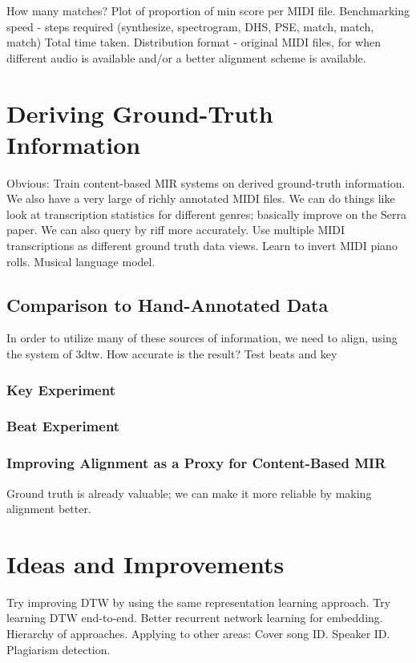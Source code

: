 How many matches?  Plot of proportion of min score per MIDI file.
Benchmarking speed - steps required (synthesize, spectrogram, DHS, PSE, match, match, match)  Total time taken.
Distribution format - original MIDI files, for when different audio is available and/or a better alignment scheme is available.

\section{Deriving Ground-Truth Information}
\label{sec:deriving}

Obvious: Train content-based MIR systems on derived ground-truth information.
We also have a very large of richly annotated MIDI files.
We can do things like look at transcription statistics for different genres; basically improve on the Serra paper.
We can also query by riff more accurately.
Use multiple MIDI transcriptions as different ground truth data views.
Learn to invert MIDI piano rolls.
Musical language model.

\subsection{Comparison to Hand-Annotated Data}
\label{sec:reliability}

In order to utilize many of these sources of information, we need to align, using the system of 3dtw.
How accurate is the result?
Test beats and key

\subsubsection{Key Experiment}

\subsubsection{Beat Experiment}

\subsubsection{Improving Alignment as a Proxy for Content-Based MIR}

Ground truth is already valuable; we can make it more reliable by making alignment better.

\section{Ideas and Improvements}
\label{sec:ideas}

Try improving DTW by using the same representation learning approach.
Try learning DTW end-to-end.
Better recurrent network learning for embedding.
Hierarchy of approaches.
Applying to other areas: Cover song ID.  Speaker ID.  Plagiarism detection.
